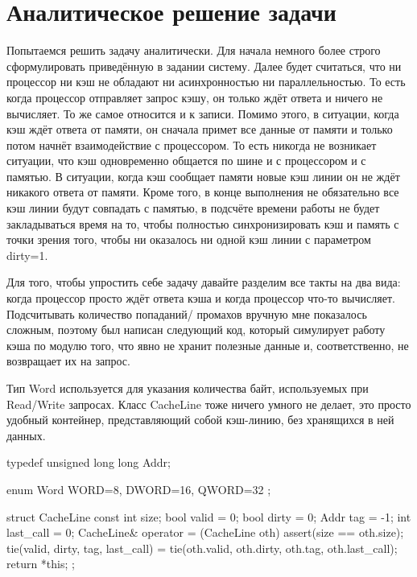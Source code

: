 \documentclass[14pt, russian, onesize]{extreport}
\begin{document}
\section*{ Аналитическое решение задачи }
Попытаемся решить задачу аналитически. Для начала немного
более строго сформулировать приведённую в задании систему.
Далее будет считаться, что ни процессор ни кэш не обладают
ни асинхронностью ни параллельностью. То есть когда процессор
отправляет запрос кэшу, он только ждёт ответа и ничего не вычисляет.
То же самое относится и к записи. Помимо этого, в ситуации, когда
кэш ждёт ответа от памяти, он сначала примет все данные от памяти и
только потом начнёт взаимодействие с процессором. То есть
никогда не возникает ситуации, что кэш одновременно общается
по шине и с процессором и с памятью. В ситуации, когда
кэш сообщает памяти новые кэш линии он не ждёт никакого ответа
от памяти. Кроме того, в конце выполнения не обязательно все кэш
линии будут совпадать с памятью, в подсчёте времени работы не
будет закладываться время на то, чтобы полностью синхронизировать
кэш и память с точки зрения того, чтобы ни оказалось ни одной
кэш линии с параметром dirty=1.

Для того, чтобы упростить
себе задачу давайте разделим все такты на два вида: когда процессор
просто ждёт ответа кэша и когда процессор что-то вычисляет. 
Подсчитывать количество попаданий\slash
промахов вручную мне показалось сложным, поэтому был написан 
следующий код, который симулирует работу кэша по модулю того,
что явно не хранит полезные данные и, соответственно,
не возвращает их на запрос.

Тип Word используется для указания количества байт, используемых
при Read\slash Write запросах. Класс CacheLine тоже ничего
умного не делает, это просто удобный контейнер, представляющий
собой кэш-линию, без хранящихся в ней данных.
\begin{cppcode}
typedef unsigned long long Addr;

enum Word { WORD=8, DWORD=16, QWORD=32 };

struct CacheLine {
    const int size;
    bool valid = 0; 
    bool dirty = 0; 
    Addr tag = -1;
    int last_call = 0;
    CacheLine& operator = (CacheLine oth) {
        assert(size == oth.size);
        tie(valid, dirty, tag, last_call) = tie(oth.valid, oth.dirty, oth.tag, oth.last_call);
        return *this;
    }
};
\end{cppcode}
\end{document}
